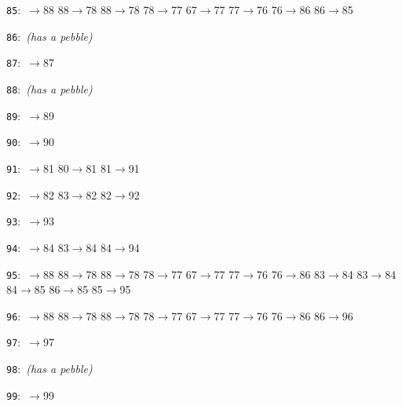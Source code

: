 \documentclass[11pt]{amsart}
\begin{document}
\begin{flushleft}
\noindent\texttt{85}:\ {\footnotesize{}$\to$88 88$\to$78 88$\to$78 78$\to$77 67$\to$77 77$\to$76 76$\to$86 86$\to$85}\par
\noindent\texttt{86}:\ {\footnotesize\ttfamily \textrm{\itshape (has a pebble)}}\par
\noindent\texttt{87}:\ {\footnotesize{}$\to$87}\par
\noindent\texttt{88}:\ {\footnotesize\ttfamily \textrm{\itshape (has a pebble)}}\par
\noindent\texttt{89}:\ {\footnotesize{}$\to$89}\par
\noindent\texttt{90}:\ {\footnotesize{}$\to$90}\par
\noindent\texttt{91}:\ {\footnotesize{}$\to$81 80$\to$81 81$\to$91}\par
\noindent\texttt{92}:\ {\footnotesize{}$\to$82 83$\to$82 82$\to$92}\par
\noindent\texttt{93}:\ {\footnotesize{}$\to$93}\par
\noindent\texttt{94}:\ {\footnotesize{}$\to$84 83$\to$84 84$\to$94}\par
\noindent\texttt{95}:\ {\footnotesize{}$\to$88 88$\to$78 88$\to$78 78$\to$77 67$\to$77 77$\to$76 76$\to$86 83$\to$84 83$\to$84 84$\to$85 86$\to$85 85$\to$95}\par
\noindent\texttt{96}:\ {\footnotesize{}$\to$88 88$\to$78 88$\to$78 78$\to$77 67$\to$77 77$\to$76 76$\to$86 86$\to$96}\par
\noindent\texttt{97}:\ {\footnotesize{}$\to$97}\par
\noindent\texttt{98}:\ {\footnotesize\ttfamily \textrm{\itshape (has a pebble)}}\par
\noindent\texttt{99}:\ {\footnotesize{}$\to$99}\par
\end{flushleft}
\end{document}
